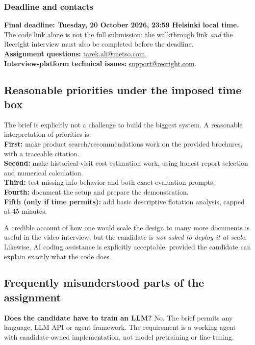 \documentclass[11pt,a4paper]{article}
\begin{document}
\subsubsection{Deadline and contacts}
\begin{keybox}
\textbf{Final deadline: Tuesday, 20 October 2026, 23:59 Helsinki local time.} The code link alone is not the full submission: the walkthrough link \emph{and} the Recright interview must also be completed before the deadline.\\[3pt]
\textbf{Assignment questions:} \href{mailto:tarek.ali@metso.com}{tarek.ali@metso.com}.\\
\textbf{Interview-platform technical issues:} \href{mailto:support@recright.com}{support@recright.com}.
\end{keybox}

\subsection{Reasonable priorities under the imposed time box}
The brief is explicitly not a challenge to build the biggest system. A reasonable interpretation of priorities is:\\
\textbf{First:} make product search/recommendations work on the provided brochures, with a traceable citation.\\
\textbf{Second:} make historical-visit cost estimation work, using honest report selection and numerical calculation.\\
\textbf{Third:} test missing-info behavior and both exact evaluation prompts.\\
\textbf{Fourth:} document the setup and prepare the demonstration.\\
\textbf{Fifth (only if time permits):} add basic descriptive flotation analysis, capped at 45 minutes.

A credible account of how one would scale the design to many more documents is useful in the video interview, but the candidate is \emph{not asked to deploy it at scale}. Likewise, AI coding assistance is explicitly acceptable, provided the candidate can explain exactly what the code does.

\subsection{Frequently misunderstood parts of the assignment}
\textbf{Does the candidate have to train an LLM?} No. The brief permits any language, LLM API or agent framework. The requirement is a working agent with candidate-owned implementation, not model pretraining or fine-tuning.
\end{document}
